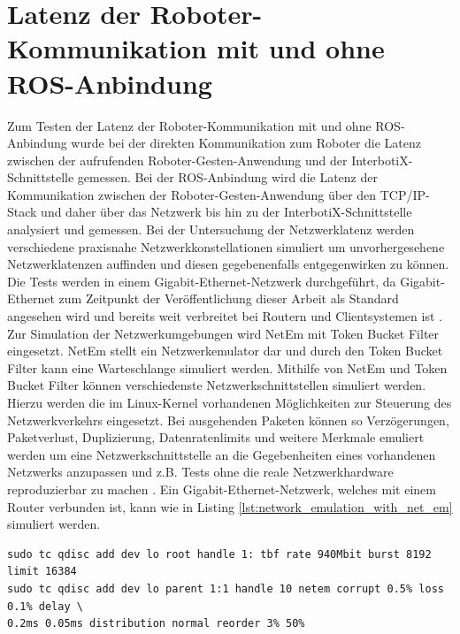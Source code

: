 \section{Latenz der Roboter-Kommunikation mit und ohne ROS-Anbindung}
Zum Testen der Latenz der Roboter-Kommunikation mit und ohne ROS-Anbindung wurde bei der direkten Kommunikation zum Roboter die Latenz zwischen der aufrufenden Roboter-Gesten-Anwendung und der InterbotiX-Schnittstelle gemessen. Bei der ROS-Anbindung wird die Latenz der Kommunikation zwischen der Roboter-Gesten-Anwendung über den TCP/IP-Stack und daher über das Netzwerk bis hin zu der InterbotiX-Schnittstelle analysiert und gemessen. Bei der Untersuchung der Netzwerklatenz werden verschiedene praxisnahe Netzwerkkonstellationen simuliert um unvorhergesehene Netzwerklatenzen auffinden und diesen gegebenenfalls entgegenwirken zu können. Die Tests werden in einem Gigabit-Ethernet-Netzwerk durchgeführt, da Gigabit-Ethernet zum Zeitpunkt der Veröffentlichung dieser Arbeit als Standard angesehen wird und bereits weit verbreitet bei Routern und Clientsystemen ist \cite{gigabit_ethernet_2020}.\\

Zur Simulation der Netzwerkumgebungen wird NetEm mit Token Bucket Filter eingesetzt. NetEm stellt ein Netzwerkemulator dar und durch den Token Bucket Filter kann eine Warteschlange simuliert werden. Mithilfe von NetEm und Token Bucket Filter können verschiedenste Netzwerkschnittstellen simuliert werden. Hierzu werden die im Linux-Kernel vorhandenen Möglichkeiten zur Steuerung des Netzwerkverkehrs eingesetzt. Bei ausgehenden Paketen können so Verzögerungen, Paketverlust, Duplizierung, Datenratenlimits und weitere Merkmale emuliert werden um eine Netzwerkschnittstelle an die Gegebenheiten eines vorhandenen Netzwerks anzupassen und z.B. Tests ohne die reale Netzwerkhardware reproduzierbar zu machen \cite{hemminger_network_nodate}. Ein Gigabit-Ethernet-Netzwerk, welches mit einem Router verbunden ist, kann wie in Listing \ref{lst:network_emulation_with_net_em} simuliert werden.\newline\vspace{-1.0em}

\begin{lstlisting}[style=bash, caption={Gigabit-Ethernet-Netzwerksimulation inklusive Simulation einer Routeranbindung mit NetEm und Token Bucket Filter}, label={lst:network_emulation_with_net_em}]
sudo tc qdisc add dev lo root handle 1: tbf rate 940Mbit burst 8192 limit 16384
sudo tc qdisc add dev lo parent 1:1 handle 10 netem corrupt 0.5% loss 0.1% delay \
0.2ms 0.05ms distribution normal reorder 3% 50%
\end{lstlisting}\leavevmode\newline\vspace{-1.0em}

